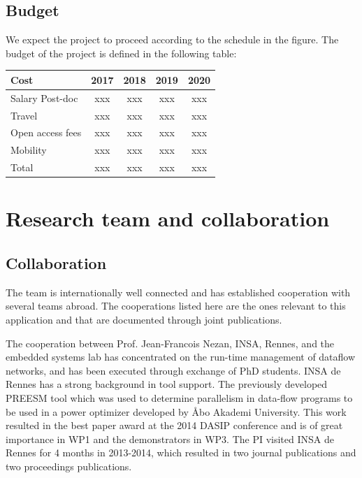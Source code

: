 \documentclass{article}
\begin{document}
\subsection{Budget}
We expect the project to proceed according to the schedule in the figure.
The budget of the project is defined in the following table:
\begin{table}[h]
\begin{center}
\begin{tabular}{ | l | c | c |c |c |}
\hline
{Cost} & {2017} & {2018} & {2019} & {2020} \\ \hline
{Salary Post-doc} & xxx & xxx & xxx & xxx \\ \hline
{Travel} & xxx & xxx & xxx & xxx  \\ \hline
{Open access fees} & xxx & xxx & xxx & xxx  \\ \hline
{Mobility} & xxx & xxx & xxx & xxx  \\ \hline
{Total} & xxx & xxx & xxx & xxx  \\ \hline
\end{tabular}
\label{tab:strconf}
\end{center}

\end{table}

\section{Research team and collaboration}
\subsection{Collaboration}
The team is internationally well connected and has established cooperation with several teams abroad. 
The cooperations listed here are the ones relevant to this application and that are documented through joint publications.

The cooperation between Prof. Jean-Francois Nezan, INSA, Rennes, and the embedded systems lab has concentrated on the run-time management of dataflow networks, 
and has been executed through exchange of PhD students.
INSA de Rennes has a strong background in tool support. 
The previously developed PREESM tool which was used to determine parallelism in data-flow programs to be used in a power optimizer developed by \AA{}bo Akademi University.
This work resulted in the best paper award at the 2014 DASIP conference and is of great importance in WP1 and the demonstrators in WP3.
The PI visited INSA de Rennes for 4 months in 2013-2014, which resulted in two journal publications and two proceedings publications.
\end{document}
